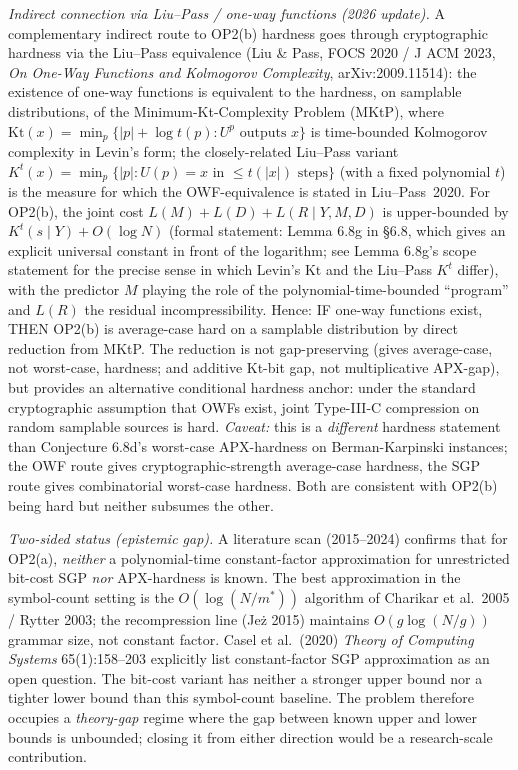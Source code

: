 \documentclass[
]{article}
\begin{document}
\begin{itemize}
  \emph{Indirect connection via Liu--Pass / one-way functions (2026
  update).} A complementary indirect route to OP2(b) hardness goes
  through cryptographic hardness via the Liu--Pass equivalence
  (Liu \& Pass, FOCS 2020 / J ACM 2023, \emph{On One-Way Functions
  and Kolmogorov Complexity}, arXiv:2009.11514): the existence of
  one-way functions is equivalent to the hardness, on samplable
  distributions, of the Minimum-Kt-Complexity Problem
  (MKtP), where $\mathrm{Kt}(x) = \min_p \{|p| + \log t(p) : U^p
  \text{ outputs } x\}$ is time-bounded Kolmogorov complexity in
  Levin's form; the closely-related Liu--Pass variant
  $K^t(x) = \min_p \{|p| : U(p) = x \text{ in } \leq t(|x|)
  \text{ steps}\}$ (with a fixed polynomial $t$) is the measure for
  which the OWF-equivalence is stated in
  Liu--Pass~2020. For OP2(b), the joint cost
  $L(M) + L(D) + L(R \mid Y, M, D)$ is upper-bounded by
  $K^t(s \mid Y) + O(\log N)$ (formal statement: Lemma 6.8g in
  §6.8, which gives an explicit universal constant in front of the
  logarithm; see Lemma 6.8g's scope statement for the precise sense
  in which Levin's $\mathrm{Kt}$ and the Liu--Pass $K^t$ differ),
  with the predictor $M$ playing the role of the
  polynomial-time-bounded ``program'' and $L(R)$ the residual
  incompressibility. Hence: IF one-way functions
  exist, THEN OP2(b) is average-case hard on a samplable distribution
  by direct reduction from MKtP. The reduction is not gap-preserving
  (gives average-case, not worst-case, hardness; and additive Kt-bit
  gap, not multiplicative APX-gap), but provides an alternative
  conditional hardness anchor: under the standard cryptographic
  assumption that OWFs exist, joint Type-III-C compression on
  random samplable sources is hard. \emph{Caveat:} this is a
  \emph{different} hardness statement than Conjecture 6.8d's
  worst-case APX-hardness on Berman-Karpinski instances; the OWF
  route gives cryptographic-strength average-case hardness, the SGP
  route gives combinatorial worst-case hardness. Both are consistent
  with OP2(b) being hard but neither subsumes the other.

  \emph{Two-sided status (epistemic gap).} A literature scan
  (2015--2024) confirms that for OP2(a), \emph{neither} a polynomial-time
  constant-factor approximation for unrestricted bit-cost SGP \emph{nor}
  APX-hardness is known. The best approximation in the symbol-count
  setting is the $O(\log(N/m^*))$ algorithm of Charikar et al.\ 2005 /
  Rytter 2003; the recompression line (Je\.z 2015) maintains
  $O(g \log(N/g))$ grammar size, not constant factor. Casel et al.\
  (2020) \emph{Theory of Computing Systems} 65(1):158--203 explicitly
  list constant-factor SGP approximation as an open question. The
  bit-cost variant has neither a stronger upper bound nor a tighter
  lower bound than this symbol-count baseline. The problem therefore
  occupies a \emph{theory-gap} regime where the gap between known
  upper and lower bounds is unbounded; closing it from either
  direction would be a research-scale contribution.


\end{itemize}
\end{document}
